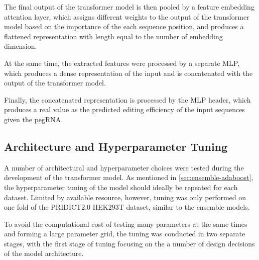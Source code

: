 The final output of the transformer model is then pooled by a feature embedding attention layer, which assigns different weights to the output of the transformer model based on the importance of the each sequence position, and produces a flattened representation with length equal to the number of embedding dimension.

At the same time, the extracted features were processed by a separate MLP, which produces a dense representation of the input and is concatenated with the output of the transformer model. 

Finally, the concatenated representation is processed by the MLP header, which produces a real value as the predicted editing efficiency of the input sequences given the pegRNA.

\subsection{Architecture and Hyperparameter Tuning}

A number of architectural and hyperparameter choices were tested during the development of the transformer model. As mentioned in \autoref{sec:ensemble-adaboost}, the hyperparameter tuning of the model should ideally be repeated for each dataset. Limited by available resource, however, tuning was only performed on one fold of the PRIDICT2.0 HEK293T dataset, similar to the ensemble models.


To avoid the computational cost of testing many parameters at the same times and forming a large parameter grid, the tuning was conducted in two separate stages, with the first stage of tuning focusing on the a number of design decisions of the model architecture. 

